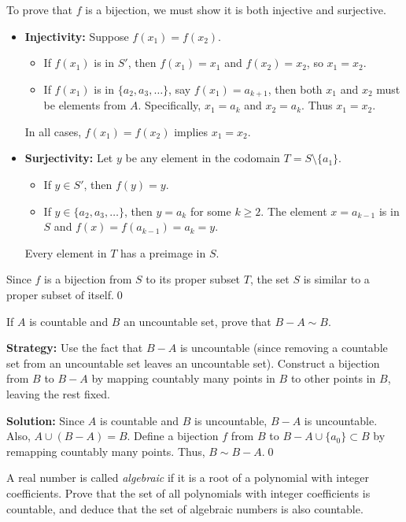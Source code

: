 To prove that $f$ is a bijection, we must show it is both injective and surjective.
\begin{itemize}
\item \textbf{Injectivity:} Suppose $f(x_1) = f(x_2)$.
\begin{itemize}
\item If $f(x_1)$ is in $S'$, then $f(x_1)=x_1$ and $f(x_2)=x_2$, so $x_1=x_2$.
\item If $f(x_1)$ is in $\{a_2, a_3, \dots\}$, say $f(x_1) = a_{k+1}$, then both $x_1$ and $x_2$ must be elements from $A$. Specifically, $x_1 = a_k$ and $x_2 = a_k$. Thus $x_1=x_2$.
\end{itemize}
In all cases, $f(x_1)=f(x_2)$ implies $x_1=x_2$.
\item \textbf{Surjectivity:} Let $y$ be any element in the codomain $T = S \setminus \{a_1\}$.
\begin{itemize}
\item If $y \in S'$, then $f(y) = y$.
\item If $y \in \{a_2, a_3, \dots\}$, then $y=a_k$ for some $k \geq 2$. The element $x=a_{k-1}$ is in $S$ and $f(x) = f(a_{k-1}) = a_k = y$.
\end{itemize}
Every element in $T$ has a preimage in $S$.
\end{itemize}
Since $f$ is a bijection from $S$ to its proper subset $T$, the set $S$ is similar to a proper subset of itself.\qed



\begin{problembox}
If \( A \) is countable and \( B \) an uncountable set, prove that \( B - A \sim B \).
\end{problembox}

\noindent\textbf{Strategy:} Use the fact that $B - A$ is uncountable (since removing a countable set from an uncountable set leaves an uncountable set). Construct a bijection from $B$ to $B - A$ by mapping countably many points in $B$ to other points in $B$, leaving the rest fixed.

\noindent\bigskip\noindent\textbf{Solution:}  
Since \( A \) is countable and \( B \) is uncountable, \( B - A \) is uncountable.  
Also, \( A \cup (B - A) = B \). Define a bijection \( f \) from \( B \) to \( B - A \cup \{a_0\} \subset B \) by remapping countably many points.  
Thus, \( B \sim B - A \).\qed



\begin{problembox}
A real number is called \emph{algebraic} if it is a root of a polynomial with integer coefficients.  
Prove that the set of all polynomials with integer coefficients is countable, and deduce that the set of algebraic numbers is also countable.
\end{problembox}

